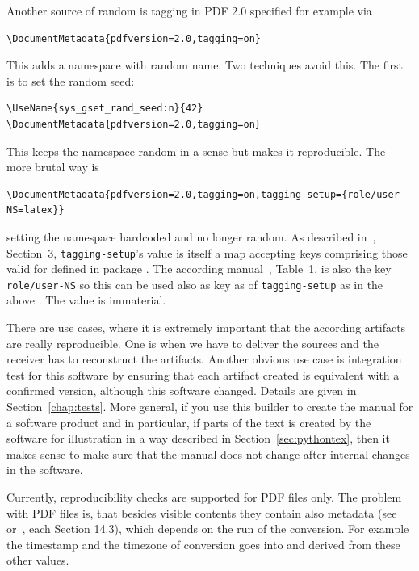 Another source of random is tagging in PDF 2.0 specified for example via 
%
\begin{Verbatim}[fontsize=\small]
\DocumentMetadata{pdfversion=2.0,tagging=on}
\end{Verbatim}
%
This adds a namespace with random name. 
Two techniques avoid this. 
The first is to set the random seed: 
%
\begin{Verbatim}[fontsize=\small]
\UseName{sys_gset_rand_seed:n}{42}
\DocumentMetadata{pdfversion=2.0,tagging=on}
\end{Verbatim}
%
This keeps the namespace random in a sense but makes it reproducible. 
The more brutal way is 
%
\begin{Verbatim}[fontsize=\small]
\DocumentMetadata{pdfversion=2.0,tagging=on,tagging-setup={role/user-NS=latex}}
\end{Verbatim}
%
setting the namespace hardcoded and no longer random. 
As described in~\cite{DocMetaDataSuppCode25}, Section~3, 
\texttt{tagging-setup}'s value is itself a map accepting keys comprising those valid for  
defined in package . 
The according manual~\cite{tagpdfP}, Table~1, is also the key \texttt{role/user-NS} 
so this can be used also as key as of \texttt{tagging-setup} as in the above . 
The value is immaterial. 







There are use cases, where it is extremely important 
that the according artifacts are really reproducible. 
One is when we have to deliver the sources 
and the receiver has to reconstruct the artifacts. 
Another obvious use case is integration test for this software 
by ensuring that each artifact created 
is equivalent with a confirmed version, 
although this software changed. 
Details are given in Section~\ref{chap:tests}. 
More general, 
if you use this builder to create the manual for a software product and in particular, 
if parts of the text is created by the software for illustration 
in a way described in Section~\ref{sec:pythontex}, 
then it makes sense to make sure that the manual does not change after internal changes in the software. 


Currently, reproducibility checks are supported for PDF files only. 
The problem with PDF files is, that besides visible contents 
they contain also metadata (see~\cite{Pdf17} or~\cite{Pdf20}, each Section 14.3), 
which depends on the run of the conversion. 
For example the timestamp and the timezone of conversion goes into 
and derived from these other values. 

